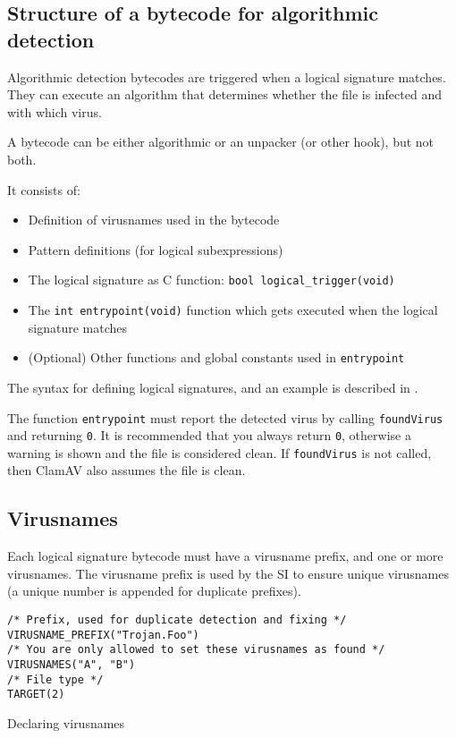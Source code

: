 \subsection{Structure of a bytecode for algorithmic detection}
Algorithmic detection bytecodes are triggered when a logical signature matches.
They can execute an algorithm that determines whether the file is infected and
with which virus.

A bytecode can be either algorithmic or an unpacker (or other hook), but not both.

It consists of:
\begin{itemize}
 \item Definition of virusnames used in the bytecode
 \item Pattern definitions (for logical subexpressions)
 \item The logical signature as C function: \verb+bool logical_trigger(void)+
 \item The \verb+int entrypoint(void)+ function which gets executed when the logical signature matches
 \item (Optional) Other functions and global constants used in \verb+entrypoint+
\end{itemize}

The syntax for defining logical signatures, and an example is described in .

The function \verb+entrypoint+ must report the detected virus by calling \verb+foundVirus+ and returning \verb+0+.
It is recommended that you always return \verb+0+, otherwise a warning is shown and the file is considered clean.
If \verb+foundVirus+ is not called, then ClamAV also assumes the file is clean.

\subsection{Virusnames}
Each logical signature bytecode must have a virusname prefix, and one or more virusnames.
The virusname prefix is used by the SI to ensure unique virusnames (a unique number is appended for duplicate prefixes).

\begin{program}
\begin{lstlisting}
/* Prefix, used for duplicate detection and fixing */
VIRUSNAME_PREFIX("Trojan.Foo")
/* You are only allowed to set these virusnames as found */
VIRUSNAMES("A", "B")
/* File type */
TARGET(2)
\end{lstlisting}
\caption{Declaring virusnames}
\label{prg:virname}
\end{program}

